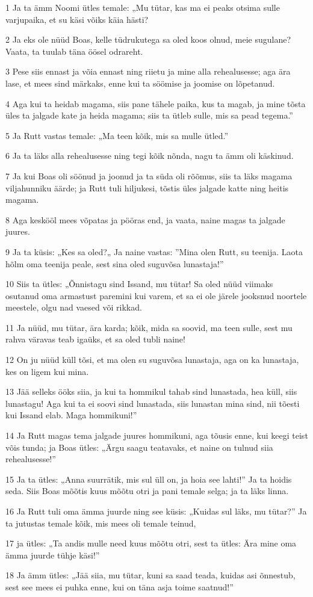 \par 1 Ja ta ämm Noomi ütles temale: „Mu tütar, kas ma ei peaks otsima sulle varjupaika, et su käsi võiks käia hästi?
\par 2 Ja eks ole nüüd Boas, kelle tüdrukutega sa oled koos olnud, meie sugulane? Vaata, ta tuulab täna öösel odrareht.
\par 3 Pese siis ennast ja võia ennast ning riietu ja mine alla rehealusesse; aga ära lase, et mees sind märkaks, enne kui ta söömise ja joomise on lõpetanud.
\par 4 Aga kui ta heidab magama, siis pane tähele paika, kus ta magab, ja mine tõsta üles ta jalgade kate ja heida magama; siis ta ütleb sulle, mis sa pead tegema.”
\par 5 Ja Rutt vastas temale: „Ma teen kõik, mis sa mulle ütled.”
\par 6 Ja ta läks alla rehealusesse ning tegi kõik nõnda, nagu ta ämm oli käskinud.
\par 7 Ja kui Boas oli söönud ja joonud ja ta süda oli rõõmus, siis ta läks magama viljahunniku äärde; ja Rutt tuli hiljukesi, tõstis üles jalgade katte ning heitis magama.
\par 8 Aga keskööl mees võpatas ja pööras end, ja vaata, naine magas ta jalgade juures.
\par 9 Ja ta küsis: „Kes sa oled?„ Ja naine vastas: ”Mina olen Rutt, su teenija. Laota hõlm oma teenija peale, sest sina oled suguvõsa lunastaja!”
\par 10 Siis ta ütles: „Õnnistagu sind Issand, mu tütar! Sa oled nüüd viimaks osutanud oma armastust paremini kui varem, et sa ei ole järele jooksnud noortele meestele, olgu nad vaesed või rikkad.
\par 11 Ja nüüd, mu tütar, ära karda; kõik, mida sa soovid, ma teen sulle, sest mu rahva väravas teab igaüks, et sa oled tubli naine!
\par 12 On ju nüüd küll tõsi, et ma olen su suguvõsa lunastaja, aga on ka lunastaja, kes on ligem kui mina.
\par 13 Jää selleks ööks siia, ja kui ta hommikul tahab sind lunastada, hea küll, siis lunastagu! Aga kui ta ei soovi sind lunastada, siis lunastan mina sind, nii tõesti kui Issand elab. Maga hommikuni!”
\par 14 Ja Rutt magas tema jalgade juures hommikuni, aga tõusis enne, kui keegi teist võis tunda; ja Boas ütles: „Ärgu saagu teatavaks, et naine on tulnud siia rehealusesse!”
\par 15 Ja ta ütles: „Anna suurrätik, mis sul üll on, ja hoia see lahti!” Ja ta hoidis seda. Siis Boas mõõtis kuus mõõtu otri ja pani temale selga; ja ta läks linna.
\par 16 Ja Rutt tuli oma ämma juurde ning see küsis: „Kuidas sul läks, mu tütar?” Ja ta jutustas temale kõik, mis mees oli temale teinud,
\par 17 ja ütles: „Ta andis mulle need kuus mõõtu otri, sest ta ütles: Ära mine oma ämma juurde tühje käsi!”
\par 18 Ja ämm ütles: „Jää siia, mu tütar, kuni sa saad teada, kuidas asi õnnestub, sest see mees ei puhka enne, kui on täna asja toime saatnud!”


